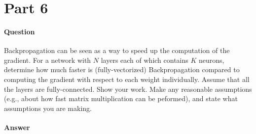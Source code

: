 \documentclass[11pt,twoside]{article}
\begin{document}
\section*{Part 6}
\paragraph{Question}
Backpropagation can be seen as a way to speed up the computation of the gradient. For a network with $N$ layers each of which contains $K$ neurons, determine how much faster is (fully-vectorized) Backpropagation compared to computing the gradient with respect to each weight individually. Assume that all the layers are fully-connected. Show your work. Make any reasonable assumptions (e.g., about how fast matrix multiplication can be peformed), and state what assumptions you are making.

\paragraph{Answer}
\end{document}
